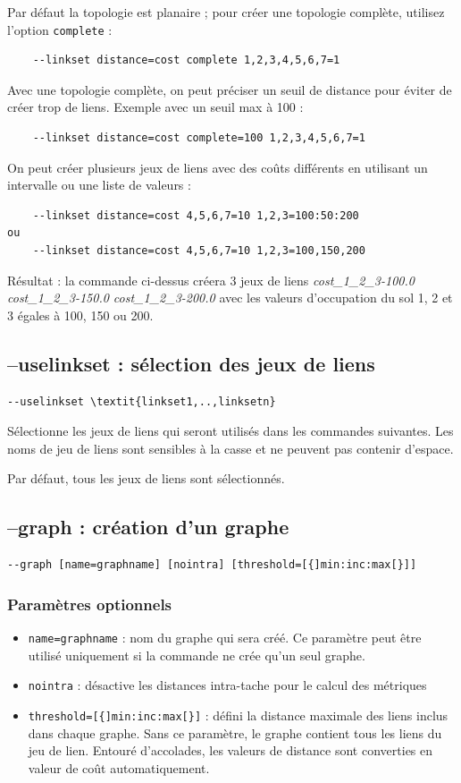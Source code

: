 \documentclass[a4paper,10pt]{report}
\begin{document}
Par défaut la topologie est planaire ; pour créer une topologie complète, utilisez l'option \verb|complete| :
\begin{Verbatim}
	--linkset distance=cost complete 1,2,3,4,5,6,7=1
\end{Verbatim}

Avec une topologie complète, on peut préciser un seuil de distance pour éviter de créer trop de liens. Exemple avec un seuil max à 100 :
\begin{Verbatim}
	--linkset distance=cost complete=100 1,2,3,4,5,6,7=1
\end{Verbatim}

On peut créer plusieurs jeux de liens avec des coûts différents en utilisant un intervalle ou une liste de valeurs :
\begin{Verbatim}
	--linkset distance=cost 4,5,6,7=10 1,2,3=100:50:200
ou
	--linkset distance=cost 4,5,6,7=10 1,2,3=100,150,200
\end{Verbatim}
Résultat : la commande ci-dessus créera 3 jeux de liens \textit{cost\_1\_2\_3-100.0 cost\_1\_2\_3-150.0 cost\_1\_2\_3-200.0}
avec les valeurs d'occupation du sol 1, 2 et 3 égales à 100, 150 ou 200.

\subsection{--uselinkset : sélection des jeux de liens}
\label{uselinkset}
\begin{Verbatim}[commandchars=\\\{\}]
--uselinkset \textit{linkset1,..,linksetn}
\end{Verbatim}
Sélectionne les jeux de liens qui seront utilisés dans les commandes suivantes.
Les noms de jeu de liens sont sensibles à la casse et ne peuvent pas contenir d'espace.

Par défaut, tous les jeux de liens sont sélectionnés.

\subsection{--graph : création d'un graphe}
\begin{Verbatim}
--graph [name=graphname] [nointra] [threshold=[{]min:inc:max[}]]
\end{Verbatim}

\subsubsection{Paramètres optionnels}
\begin{itemize}
	\item \verb|name=graphname| : nom du graphe qui sera créé. Ce paramètre peut être utilisé uniquement si la commande ne crée qu'un seul graphe.
	\item \verb|nointra| : désactive les distances intra-tache pour le calcul des métriques
	\item \verb|threshold=[{]min:inc:max[}]| : défini la distance maximale des liens inclus dans chaque graphe. Sans ce paramètre, le graphe contient tous les liens du jeu de lien. Entouré d'accolades, les valeurs de distance sont converties en valeur de coût automatiquement.
\end{itemize}
\end{document}
